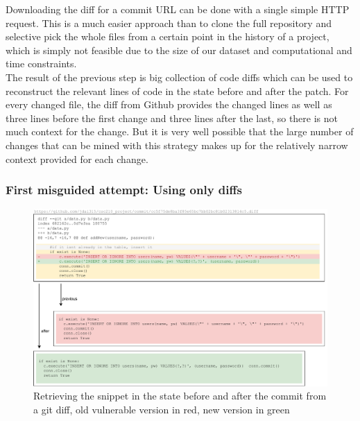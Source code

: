 \documentclass[
	a4paper,
	pagesize,
	pdftex,
	12pt,
	twoside, %
	BCOR=5mm, %
	ngerman,
	fleqn,
	final,
	]{scrartcl}
\begin{document}
Downloading the diff for a commit URL can be done with a single simple HTTP request. This is a much easier approach than to clone the full repository and selective pick the whole files from a certain point in the history of a project, which is simply not feasible due to the size of our dataset and computational and time constraints. \\
The result of the previous step is big collection of code diffs which can be used to reconstruct the relevant lines of code in the state before and after the patch. For every changed file, the diff from Github provides the changed lines as well as three lines before the first change and three lines after the last, so there is not much context for the change. 
But it is very well possible that the large number of changes that can be mined with this strategy makes up for the relatively narrow context provided for each change.\\
\subsubsection{First misguided attempt: Using only diffs}

\begin{figure}[ht]
	\centering
	\includegraphics[width=\linewidth]{img/GitCommitPreviousAfter}
	\caption{Retrieving the snippet in the state before and after the commit from a git diff, old vulnerable version in red, new version in green}
	\label{fig:gitdiff}
\end{figure}
\end{document}
